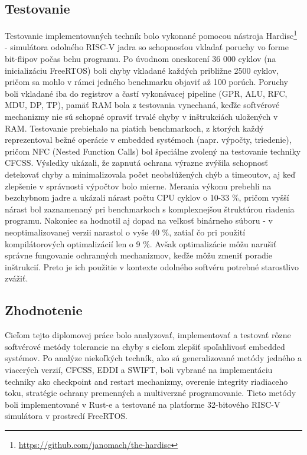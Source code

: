\documentclass[12pt, letterpaper, slovak]{article}
\begin{document}
\subsection*{Testovanie}

Testovanie implementovaných techník bolo vykonané pomocou nástroja Hardisc\footnote{\url{https://github.com/janomach/the-hardisc}} - simulátora odolného RISC-V jadra so schopnosťou vkladať poruchy vo forme bit-flipov počas behu programu. Po úvodnom oneskorení 36 000 cyklov (na inicializáciu FreeRTOS) boli chyby vkladané každých približne 2500 cyklov, pričom sa mohlo v rámci jedného benchmarku objaviť až 100 porúch. Poruchy boli vkladané iba do registrov a častí vykonávacej pipeline (GPR, ALU, RFC, MDU, DP, TP), pamäť RAM bola z testovania vynechaná, keďže softvérové mechanizmy nie sú schopné opraviť trvalé chyby v inštrukciách uložených v RAM. Testovanie prebiehalo na piatich benchmarkoch, z ktorých každý reprezentoval bežné operácie v embedded systémoch (napr. výpočty, triedenie), pričom NFC (Nested Function Calls) bol špeciálne zvolený na testovanie techniky CFCSS. Výsledky ukázali, že zapnutá ochrana výrazne zvýšila schopnosť detekovať chyby a minimalizovala počet neobslúžených chýb a timeoutov, aj keď zlepšenie v správnosti výpočtov bolo mierne. Merania výkonu prebehli na bezchybnom jadre a ukázali nárast počtu CPU cyklov o 10-33 \%, pričom vyšší nárast bol zaznamenaný pri benchmarkoch s komplexnejšou štruktúrou riadenia programu. Nakoniec sa hodnotil aj dopad na veľkosť binárneho súboru - v neoptimalizovanej verzii narastol o vyše 40 \%, zatiaľ čo pri použití kompilátorových optimalizácií len o 9 \%. Avšak optimalizácie môžu narušiť správne fungovanie ochranných mechanizmov, keďže môžu zmeniť poradie inštrukcií. Preto je ich použitie v kontexte odolného softvéru potrebné starostlivo zvážiť.

\subsection*{Zhodnotenie}

Cieľom tejto diplomovej práce bolo analyzovať, implementovať a testovať rôzne softvérové metódy tolerancie na chyby s cieľom zlepšiť spoľahlivosť embedded systémov. Po analýze niekoľkých techník, ako sú generalizované metódy jedného a viacerých verzií, CFCSS, EDDI a SWIFT, boli vybrané na implementáciu techniky ako checkpoint and restart mechanizmy, overenie integrity riadiaceho toku, stratégie ochrany premenných a multiverzné programovanie. Tieto metódy boli implementované v Rust-e a testované na platforme 32-bitového RISC-V simulátora v prostredí FreeRTOS.
\end{document}
